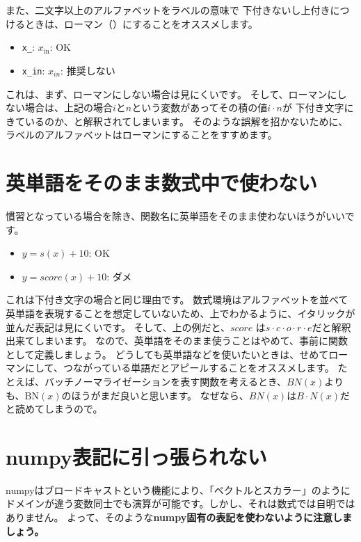 \documentclass[uplatex,twocolumn,9pt,dvipdfmx]{jsarticle}
\begin{document}
また、二文字以上のアルファベットをラベルの意味で
下付きないし上付きにつけるときは、ローマン（\texttt{\mathrm}）にすることをオススメします。
\begin{itemize}
    \item \texttt{x_}: $x_\mathrm{in}$: OK
    \item \texttt{x_{in}}: $x_{in}$: 推奨しない
\end{itemize}
これは、まず、ローマンにしない場合は見にくいです。
そして、ローマンにしない場合は、上記の場合$i$と$n$という変数があってその積の値$i \cdot n$が
下付き文字にきているのか、と解釈されてしまいます。
そのような誤解を招かないために、ラベルのアルファベットはローマンにすることをすすめます。


\section{英単語をそのまま数式中で使わない}
慣習となっている場合を除き、関数名に英単語をそのまま使わないほうがいいです。
\begin{itemize}
    \item $y = s(x) + 10$: OK
    \item $y = score(x) + 10$: ダメ
\end{itemize}
これは下付き文字の場合と同じ理由です。
数式環境はアルファベットを並べて英単語を表現することを想定していないため、上でわかるように、イタリックが並んだ表記は見にくいです。
そして、上の例だと、$score$ は$s \cdot c \cdot o \cdot r \cdot e$だと解釈出来てしまいます。
なので、英単語をそのまま使うことはやめて、事前に関数として定義しましょう。
どうしても英単語などを使いたいときは、せめてローマンにして、つながっている単語だとアピールすることをオススメします。
たとえば、バッチノーマライゼーションを表す関数を考えるとき、$BN(x)$よりも、$\mathrm{BN}(x)$のほうがまだ良いと思います。
なぜなら、$BN(x)$は$B \cdot N(x)$だと読めてしまうので。


\section{numpy表記に引っ張られない}
numpyはブロードキャストという機能により、「ベクトルとスカラー」のように
ドメインが違う変数同士でも演算が可能です。しかし、それは数式では自明ではありません。
よって、そのような\textbf{numpy固有の表記を使わないように注意しましょう。}
\end{document}
